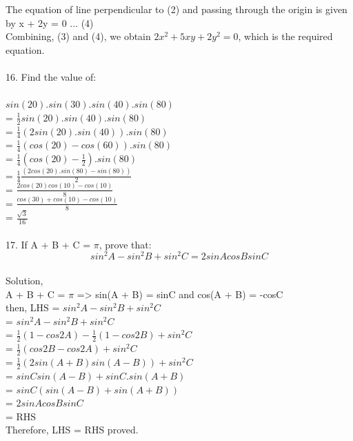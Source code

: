 \documentclass[a4paper,17pt]{extarticle}
\begin{document}
{The equation of line perpendicular to (2) and passing through the origin is given by x + 2y = 0 ... (4) \\
Combining, (3) and (4), we obtain $2x^2 + 5xy + 2y^2 = 0$, which is the required equation. \\ \\
16. Find the value of: \\ \\
$sin(20).sin(30).sin(40).sin(80)$ \\
= $\frac{1}{2}sin(20).sin(40).sin(80)$ \\
= $\frac{1}{4}(2sin(20).sin(40)).sin(80)$ \\
= $\frac{1}{4}(cos(20) - cos(60)).sin(80)$ \\
= $\frac{1}{4}(cos(20) - \frac{1}{2}).sin(80)$ \\
= $\frac{1}{4}$$\frac{(2cos(20).sin(80) - sin(80))}{2}$ \\
= $\frac{2cos(20)cos(10) - cos(10)}{8}$ \\
= $\frac{cos(30) + cos(10) - cos(10)}{8}$ \\
= $\frac{\sqrt{3}}{16}$
\\ \\
17. If A + B + C = $\pi$, prove that:
\[sin^2A - sin^2B + sin^2C = 2sinAcosBsinC\] \\
Solution, \\
A + B + C = $\pi$ => sin(A + B) = sinC and cos(A + B) = -cosC \\ 
then, 
LHS = $sin^2A - sin^2B + sin^2C$ \\ 
= $sin^2A - sin^2B + sin^2C$ \\ 
= $\frac{1}{2}(1 - cos2A) - \frac{1}{2}(1 - cos2B) + sin^2C$ \\
= $\frac{1}{2}(cos2B - cos2A) + sin^2C$ \\ 
= $\frac{1}{2}(2sin(A + B)sin(A - B)) + sin^2C$ \\
= $sinCsin(A - B) + sinC.sin(A + B)$ \\
= $sinC(sin(A - B) + sin(A + B))$ \\
= $2sinAcosBsinC$ \\
= RHS \\ 
Therefore, LHS = RHS proved. \\ \\}
\end{document}
